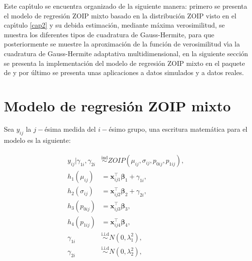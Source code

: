 Este cap\'{\i}tulo se encuentra organizado de la siguiente manera: primero se presenta el modelo de regresi\'{o}n ZOIP mixto basado en la distribuci\'{o}n ZOIP visto en el cap\'{\i}tulo \ref{cap2} y su debida estimaci\'{o}n, mediante m\'{a}xima verosimilitud, se muestra los diferentes tipos de cuadratura de Gauss-Hermite, para que posteriormente se muestre la aproximaci\'{o}n de la funci\'{o}n de verosimilitud v\'{\i}a la cuadratura de Gauss-Hermite adaptativa multidimensional, en la si\-gui\-en\-te secci\'{o}n se presenta la implementaci\'{o}n del modelo de regresi\'{o}n ZOIP mixto en el paquete  de  y por \'{u}ltimo se presenta unas aplicaciones a datos simulados y a datos reales.



\section{Modelo de regresi\'{o}n ZOIP mixto}



Sea $y_{ij}$ la $j-$\'{e}sima medida del $i-$\'{e}simo grupo, una escritura matem\'{a}tica para el modelo es la siguiente:



\begin{align}
\begin{split}
y_{ij}| \gamma_{1i},\gamma_{2i} & \overset{\text{ind}}{\sim} ZOIP(\mu_{ij},\sigma_{ij},p_{0ij}, p_{1ij}),\\
	h_1(\mu_{ij}) &= \mathbf{x}_{ij1}^{\top} \boldsymbol{\beta}_1+ \gamma_{1i},\\
	h_2(\sigma_{ij}) &= \mathbf{x}_{ij2}^{\top} \boldsymbol{\beta}_2+ \gamma_{2i},\\
	h_3(p_{0ij}) &= \mathbf{x}_{ij3}^{\top} \boldsymbol{\beta}_3,\\
	h_4(p_{1ij}) &= \mathbf{x}_{ij4}^{\top} \boldsymbol{\beta}_4,\\
	\gamma_{1i} & \overset{\text{i.i.d}}{\sim}  N(0,\lambda_1^2),\\
	\gamma_{2i} & \overset{\text{i.i.d}}{\sim}  N(0,\lambda_2^2),
\end{split}
\label{Mod_pmix}
\end{align}

